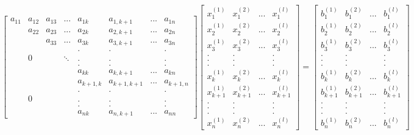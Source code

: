 \documentclass[12pt]{article}
\begin{document}
$$
\begin{bmatrix}
a_{11} & a_{12} & a_{13} & ... & a_{1k} & a_{1,k+1} & ... & a_{1n}\\
& a_{22}  & a_{23}  & ... & a_{2k}  & a_{2,k+1}  & ... & a_{2n} \\
&  & a_{33}  & ... & a_{3k}  & a_{3,k+1}  & ... & a_{3n} \\
&  &  &  & . & . &  & .\\
& 0 &  & \ddots  & . & . &  & .\\
&  &  &  & . & . &  & .\\
&  &  &  & a_{kk}  & a_{k,k+1}  & ... & a_{kn}  \\
&  &  &  & a_{k+1,k}  & a_{k+1,k+1}  & ... & a_{k+1,n} \\
&  &  &  & . & . &  & .\\
& 0 &  &  & . & . &  & .\\
&  &  &  & . & . &  & .\\
&  &  &  & a_{nk}  & a_{n,k+1}  & ... & a_{nn} 
\end{bmatrix} 
\begin{bmatrix}
x_{1}^{(1)} & x_{1}^{(2)} & ... & x_{1}^{(l)}\\
x_{2}^{(1)} & x_{2}^{(2)} & ... & x_{2}^{(l)}\\
x_{3}^{(1)} & x_{3}^{(2)} & ... & x_{3}^{(l)}\\
. & . &  & .\\
. & . &  & .\\
. & . &  & .\\
x_{k}^{(1)} & x_{k}^{(2)} & ... & x_{k}^{(l)}\\
x_{k+1}^{(1)} & x_{k+1}^{(2)} & ... & x_{k+1}^{(l)}\\
. & . &  & .\\
. & . &  & .\\
. & . &  & .\\
x_{n}^{(1)} & x_{n}^{(2)} & ... & x_{n}^{(l)}
\end{bmatrix}  
=
\begin{bmatrix}
b_{1}^{(1)} & b_{1}^{(2)} & ... & b_{1}^{(l)}\\
b_{2}^{(1)} & b_{2}^{(2)} & ... & b_{2}^{(l)}\\
b_{3}^{(1)} & b_{3}^{(2)} & ... & b_{3}^{(l)}\\
. & . &  & .\\
. & . &  & .\\
. & . &  & .\\
b_{k}^{(1)} & b_{k}^{(2)} & ... & b_{k}^{(l)}\\
b_{k+1}^{(1)} & b_{k+1}^{(2)} & ... & b_{k+1}^{(l)}\\
. & . &  & .\\
. & . &  & .\\
. & . &  & .\\
b_{n}^{(1)} & b_{n}^{(2)} & ... & b_{n}^{(l)}
\end{bmatrix}
$$
\end{document}
